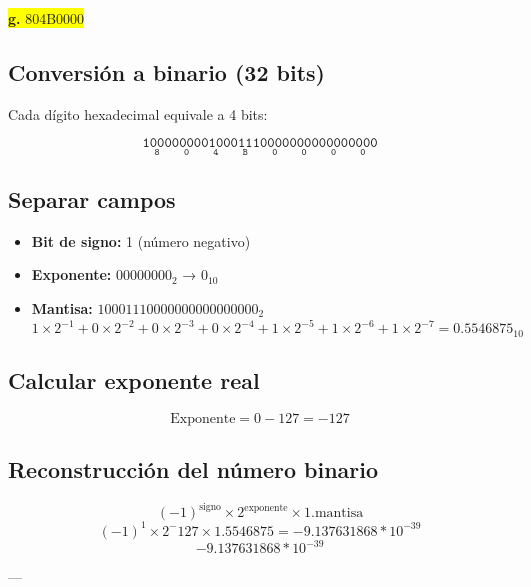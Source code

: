 \documentclass[a4paper,12pt]{article}
\begin{document}
	\begin{center}
		\colorbox{yellow}{\textbf{g.} 804B0000}
		\subsection*{Conversión a binario (32 bits)}
		Cada dígito hexadecimal equivale a 4 bits:
		
		\[
		\mathtt{
			\underset{\text{8}}{\boxed{\mathtt{1000}}}
			\underset{\text{0}}{\boxed{\mathtt{0000}}}
			\underset{\text{4}}{\boxed{\mathtt{0100}}}
			\underset{\text{B}}{\boxed{\mathtt{0111}}}
			\underset{\text{0}}{\boxed{\mathtt{0000}}}
			\underset{\text{0}}{\boxed{\mathtt{0000}}}
			\underset{\text{0}}{\boxed{\mathtt{0000}}}
			\underset{\text{0}}{\boxed{\mathtt{0000}}}
		}	
		\]
		
		\subsection*{Separar campos}
		
		\begin{itemize}
			\item \textbf{Bit de signo:} 1 (número negativo)
			\item \textbf{Exponente:} $00000000_2$ → $0_{10}$
			\item \textbf{Mantisa:} $10001110000000000000000_2$ 
			\[
			1\times2^{-1} + 0\times2^{-2} + 0\times2^{-3} + 0\times2^{-4} + 1\times2^{-5} + 1\times2^{-6} + 1\times2^{-7} = 0.5546875_{10}
			\]
		\end{itemize}
		
		\subsection*{Calcular exponente real}
		
		\[
		\text{Exponente} = 0 - 127 = -127
		\]
		
		
		
		\subsection*{Reconstrucción del número binario}	
		\[
		(-1)^{\text{signo}} \times 2^{\text{exponente}} \times 1.\text{mantisa}
		\]
		\[
		(-1)^1 \times 2^-127 \times 1.5546875 = -9.137631868*10^{-39}
		\]
		\vspace{1em}
		\[
		\boxed{-9.137631868*10^{-39}}
		\]
		
		---
	\end{center}
\end{document}
